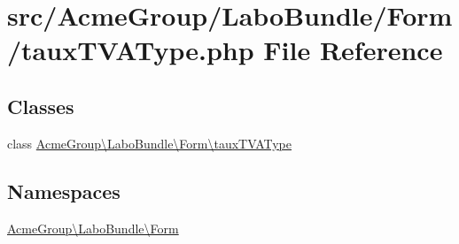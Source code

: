 \hypertarget{taux_t_v_a_type_8php}{\section{src/\+Acme\+Group/\+Labo\+Bundle/\+Form/taux\+T\+V\+A\+Type.php File Reference}
\label{taux_t_v_a_type_8php}
}
\subsection*{Classes}
\begin{DoxyCompactItemize}
\item 
class \hyperlink{class_acme_group_1_1_labo_bundle_1_1_form_1_1taux_t_v_a_type}{Acme\+Group\textbackslash{}\+Labo\+Bundle\textbackslash{}\+Form\textbackslash{}taux\+T\+V\+A\+Type}
\end{DoxyCompactItemize}
\subsection*{Namespaces}
\begin{DoxyCompactItemize}
\item 
 \hyperlink{namespace_acme_group_1_1_labo_bundle_1_1_form}{Acme\+Group\textbackslash{}\+Labo\+Bundle\textbackslash{}\+Form}
\end{DoxyCompactItemize}
